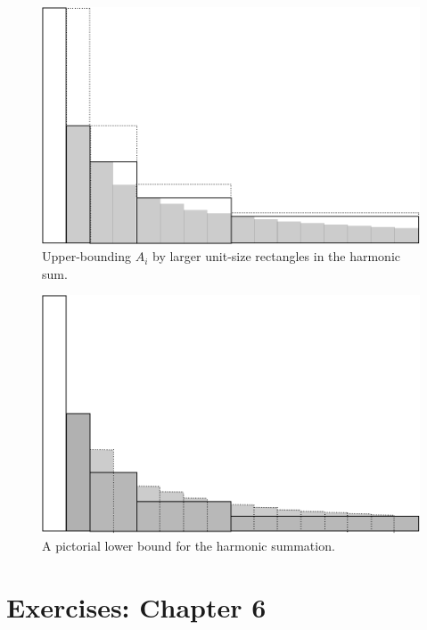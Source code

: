 \begin{figure}[htb]
\centerline{
\includegraphics[scale=0.24]{FiguresMaths/HarmonicSumUpperbound}
}
\caption{Upper-bounding $A_i$ by larger unit-size rectangles in the harmonic sum.}
\label{fig:HarmonicSumUpperbound}
\end{figure}

\begin{figure}[htb]
\centerline{
\includegraphics[scale=0.24]{FiguresMaths/HarmonicSumLowerbound}
}
\caption{A pictorial lower bound for the harmonic summation.}
\label{fig:HarmonicSumLowerbound}
\end{figure}




\section{Exercises: Chapter 6}

